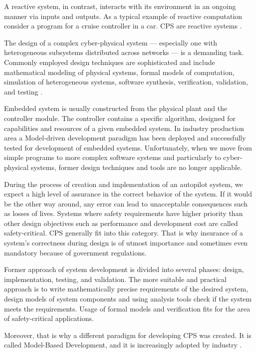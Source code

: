 A reactive system, in contrast, interacts with its environment in an ongoing manner via inputs and outputs. As a typical example of reactive computation consider a program for a cruise controller in a car. CPS are reactive systems \cite{Rajeev:PrinciplesCPS}.

The design of a complex cyber-physical system — especially one with heterogeneous subsystems distributed across networks — is a demanding task. Commonly employed design techniques are sophisticated and include mathematical modeling of physical systems, formal models of computation, simulation of heterogeneous systems, software synthesis, verification, validation, and testing \cite{Lee:MBD}.

Embedded system is usually constructed from the physical plant and the controller module. The controller contains a specific algorithm, designed for capabilities and resources of a given embedded system. In industry production area a Model-driven development paradigm has been deployed and successfully tested for development of embedded systems. Unfortunately, when we move from simple programs to more complex software systems and particularly to cyber-physical systems, former design techniques and tools are no longer applicable.

During the process of creation and implementation of an autopilot system, we expect a high level of assurance in the correct behavior of the system. If it would be the other way around, any error can lead to unacceptable consequences such as losses of lives. Systems where safety requirements have higher priority than other design objectives such as performance and development cost are called safety-critical. CPS generally fit into this category. That is why insurance of a system's correctness during design is of utmost importance and sometimes even mandatory because of government regulations.


Former approach of system development is divided into several phases: design, implementation, testing, and validation. The more suitable and practical approach is to write mathematically precise requirements of the desired system, design models of system components and using analysis tools check if the system meets the requirements. Usage of formal models and verification fits for the area of safety-critical applications. 

Moreover, that is why a different paradigm for developing CPS was created. It is called Model-Based Development, and it is increasingly adopted by industry \cite{Mohalik:ModelCheckingSimulink}.

